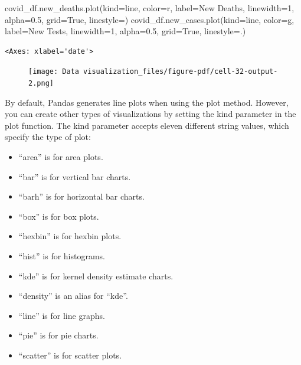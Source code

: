 \documentclass[
  letterpaper,
  DIV=11,
  numbers=noendperiod]{scrreprt}
\newenvironment{Shaded}{\begin{snugshade}}{\end{snugshade}}
\newcommand{\DecValTok}[1]{\textcolor[rgb]{0.68,0.00,0.00}{#1}}
\newcommand{\FloatTok}[1]{\textcolor[rgb]{0.68,0.00,0.00}{#1}}
\newcommand{\NormalTok}[1]{\textcolor[rgb]{0.00,0.23,0.31}{#1}}
\newcommand{\OperatorTok}[1]{\textcolor[rgb]{0.37,0.37,0.37}{#1}}
\newcommand{\StringTok}[1]{\textcolor[rgb]{0.13,0.47,0.30}{#1}}
\newcommand{\VariableTok}[1]{\textcolor[rgb]{0.07,0.07,0.07}{#1}}
\providecommand{\tightlist}{%
  \setlength{\itemsep}{0pt}\setlength{\parskip}{0pt}}\usepackage{longtable,booktabs,array}
\begin{document}
\begin{Shaded}
\begin{Highlighting}[]
\NormalTok{covid\_df.new\_deaths.plot(kind}\OperatorTok{=}\StringTok{\textquotesingle{}line\textquotesingle{}}\NormalTok{, color}\OperatorTok{=}\StringTok{\textquotesingle{}r\textquotesingle{}}\NormalTok{, label}\OperatorTok{=}\StringTok{\textquotesingle{}New Deaths\textquotesingle{}}\NormalTok{, linewidth}\OperatorTok{=}\DecValTok{1}\NormalTok{, alpha}\OperatorTok{=}\FloatTok{0.5}\NormalTok{, grid}\OperatorTok{=}\VariableTok{True}\NormalTok{, linestyle}\OperatorTok{=}\StringTok{\textquotesingle{}{-}{-}\textquotesingle{}}\NormalTok{)}
\NormalTok{covid\_df.new\_cases.plot(kind}\OperatorTok{=}\StringTok{\textquotesingle{}line\textquotesingle{}}\NormalTok{, color}\OperatorTok{=}\StringTok{\textquotesingle{}g\textquotesingle{}}\NormalTok{, label}\OperatorTok{=}\StringTok{\textquotesingle{}New Tests\textquotesingle{}}\NormalTok{, linewidth}\OperatorTok{=}\DecValTok{1}\NormalTok{, alpha}\OperatorTok{=}\FloatTok{0.5}\NormalTok{, grid}\OperatorTok{=}\VariableTok{True}\NormalTok{, linestyle}\OperatorTok{=}\StringTok{\textquotesingle{}{-}.\textquotesingle{}}\NormalTok{)}
\end{Highlighting}
\end{Shaded}

\begin{verbatim}
<Axes: xlabel='date'>
\end{verbatim}

\begin{figure}[H]

{\centering \texttt{[image: Data visualization\_files/figure-pdf/cell-32-output-2.png]}

}

\end{figure}

By default, Pandas generates line plots when using the plot method.
However, you can create other types of visualizations by setting the
kind parameter in the plot function. The kind parameter accepts eleven
different string values, which specify the type of plot:

\begin{itemize}
\tightlist
\item
  ``area'' is for area plots.
\item
  ``bar'' is for vertical bar charts.
\item
  ``barh'' is for horizontal bar charts.
\item
  ``box'' is for box plots.
\item
  ``hexbin'' is for hexbin plots.
\item
  ``hist'' is for histograms.
\item
  ``kde'' is for kernel density estimate charts.
\item
  ``density'' is an alias for ``kde''.
\item
  ``line'' is for line graphs.
\item
  ``pie'' is for pie charts.
\item
  ``scatter'' is for scatter plots.
\end{itemize}
\end{document}
